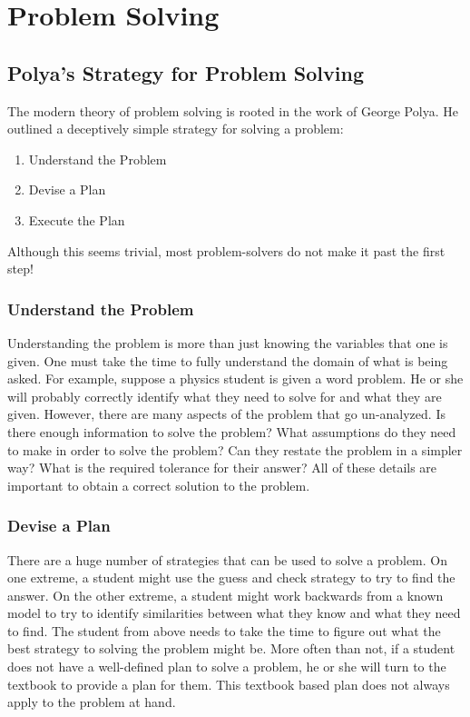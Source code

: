 \section{Problem Solving}

\subsection{Polya's Strategy for Problem Solving}

The modern theory of problem solving is rooted in the work of George Polya\cite{polya1985}. He outlined a deceptively simple strategy for solving a problem:

\begin{enumerate}
\item Understand the Problem
\item Devise a Plan
\item Execute the Plan
\end{enumerate}

Although this seems trivial, most problem-solvers do not make it past the first step!

\subsubsection{Understand the Problem}

Understanding the problem is more than just knowing the variables that one is given. One must take the time to fully understand the domain of what is being asked. For example, suppose a physics student is given a word problem. He or she will probably correctly identify what they need to solve for and what they are given. However, there are many aspects of the problem that go un-analyzed. Is there enough information to solve the problem? What assumptions do they need to make in order to solve the problem? Can they restate the problem in a simpler way? What is the required tolerance for their answer? All of these details are important to obtain a correct solution to the problem.

\subsubsection{Devise a Plan}

There are a huge number of strategies that can be used to solve a problem. On one extreme, a student might use the guess and check strategy to try to find the answer. On the other extreme, a student might work backwards from a known model to try to identify similarities between what they know and what they need to find. The student from above needs to take the time to figure out what the best strategy to solving the problem might be. More often than not, if a student does not have a well-defined plan to solve a problem, he or she will turn to the textbook to provide a plan for them. This textbook based plan does not always apply to the problem at hand.

